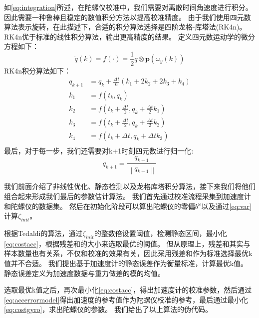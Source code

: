 \documentclass[
  type=master
]{gdutthesis}
\begin{document}
如\autoref{eq:integration}所述，在陀螺仪校准中，我们需要对离散时间角速度进行积分。
因此需要一种鲁棒且稳定的数值积分方法以提高校准精度。
由于我们使用四元数算法表示旋转，在此描述下，合适的积分算法选择是四阶龙格-库塔法(RK4n)\cite{andrle2013geometric}。
RK4n优于标准的线性积分算法，输出更高精度的结果。
定义四元数运动学的微分方程如下：
\begin{equation}
	\dot{q}(k)=f(\cdot )=\frac{1}{2} q \otimes \mathbf{p}(\omega_y(k))
\end{equation}
RK4n积分算法如下：
\begin{equation}\label{eq:rk4}
	\begin{aligned}
		q_{k+1} &= q_k + \frac{\Delta t}{6}(k_1 + 2 k_2 + 2 k_3 + k_4)\\
		k_1 &= f(t_k , q_k)\\
		k_2 &= f(t_k + \frac{\Delta t}{2},q_k + \frac{\Delta t}{2} k_1)\\
		k_3 &= f(t_k + \frac{\Delta t}{2},q_k + \frac{\Delta t}{2} k_2)\\
		k_4 &= f(t_k + \Delta t, q_k + \Delta t k_3)\\
	\end{aligned}
\end{equation}
最后，对于每一步，我们还需要对k+1时刻四元数进行归一化:
\begin{equation}
	q_{k+1} = \frac{q_{k+1}}{\left\|q_{k+1}\right\|}
\end{equation}

我们前面介绍了非线性优化、静态检测以及龙格库塔积分算法，接下来我们将他们组合起来形成我们最后的参数估计算法。
我们首先通过校准流程采集到加速度计和陀螺仪的数据集。
然后在初始化阶段可以算出陀螺仪的零偏$b^\omega$以及通过\autoref{eq:var}计算$\zeta_{init}$。

根据Tedaldi的算法\cite{tedaldi2014robust}，通过$\zeta_{init}$的整数倍设置阈值，检测静态区间，最小化\autoref{eq:costacc}，根据残差和的大小来选取最优的阈值。
但从原理上，残差和其实与样本数量也有关系，不仅和校准的效果有关，因此采用残差和作为标准选择最优k值并不合适。
我们提出基于加速度计的静态误差作为衡量标准，计算最优k值。
静态误差定义为加速度数据与重力做差的模的均值。

选取最优k值之后，再次最小化\autoref{eq:costacc}，得出加速度计的校准参数，然后通过\autoref{eq:accerrormodel}得出加速度的参考值作为陀螺仪校准的参考，最后通过最小化\autoref{eq:costgyro}，求出陀螺仪的参数。
我们给出了以上算法的伪代码。
\end{document}
